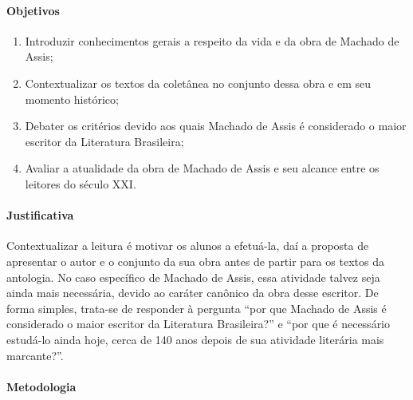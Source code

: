 \documentclass{extarticle}
\begin{document}
\paragraph{Objetivos}

\begin{enumerate}
\item Introduzir conhecimentos gerais a respeito da
vida e da obra de Machado de Assis; 
\item Contextualizar os textos da
coletânea no conjunto dessa obra e em seu momento histórico; 
\item Debater
os critérios devido aos quais Machado de Assis é considerado o maior
escritor da Literatura Brasileira; 
\item Avaliar a atualidade da obra de
Machado de Assis e seu alcance entre os leitores do século XXI.
\end{enumerate}

\paragraph{Justificativa} Contextualizar a leitura é motivar os alunos a
efetuá-la, daí a proposta de apresentar o autor e o conjunto da sua obra
antes de partir para os textos da antologia. No caso específico de
Machado de Assis, essa atividade talvez seja ainda mais necessária,
devido ao caráter canônico da obra desse escritor. De forma simples,
trata-se de responder à pergunta ``por que Machado de Assis é
considerado o maior escritor da Literatura Brasileira?'' e ``por que é
necessário estudá-lo ainda hoje, cerca de 140 anos depois de sua
atividade literária mais marcante?''.

\paragraph{Metodologia}
\end{document}
